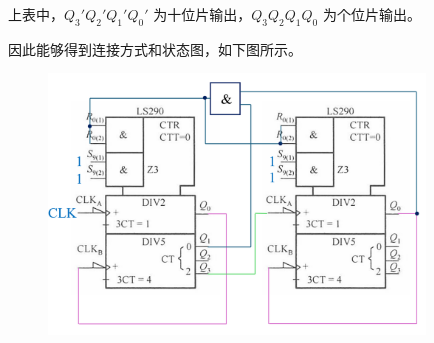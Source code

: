 \documentclass[UTF8]{ctexart}
\begin{document}
\newpage
{}
\BgThispage

上表中，$Q_3'Q_2'Q_1'Q_0'$ 为十位片输出，$Q_3Q_2Q_1Q_0$ 为个位片输出。

因此能够得到连接方式和状态图，如下图所示。
\begin{figure}[htb]
  \centering
  \includegraphics[width=10cm]{答案.png}
\end{figure}
\end{document}

